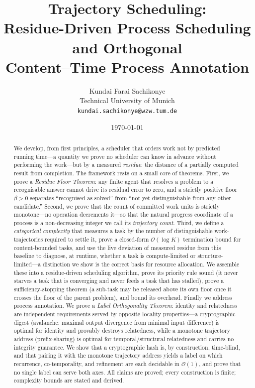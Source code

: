 \documentclass[twocolumn,10pt,a4paper]{article}
\title{\textbf{Trajectory Scheduling:\\[2pt]
Residue-Driven Process Scheduling and Orthogonal\\
Content--Time Process Annotation}}
\author{%
Kundai Farai Sachikonye\\
\small Technical University of Munich\\
\small \texttt{kundai.sachikonye@wzw.tum.de}}
\date{\today}
\theoremstyle{thmstyle}
\theoremstyle{definition}
\theoremstyle{remark}
\newcommand{\floor}{\beta}
\begin{document}
\maketitle

\begin{abstract}
\noindent
We develop, from first principles, a scheduler that orders work not by
predicted running time---a quantity we prove no scheduler can know in
advance without performing the work---but by a measured \emph{residue}:
the distance of a partially computed result from completion. The
framework rests on a small core of theorems. First, we prove a
\emph{Residue Floor Theorem}: any finite agent that resolves a problem
to a recognisable answer cannot drive its residual error to zero, and a
strictly positive floor $\floor>0$ separates ``recognised as solved''
from ``not yet distinguishable from any other candidate.'' Second, we
prove that the count of committed work units is strictly monotone---no
operation decrements it---so that the natural progress coordinate of a
process is a non-decreasing integer we call its \emph{trajectory count}.
Third, we define a \emph{categorical complexity} that measures a task by
the number of distinguishable work-trajectories required to settle it,
prove a closed-form $\mathcal{O}(\log K)$ termination bound for
content-bounded tasks, and use the live deviation of measured residue
from this baseline to diagnose, at runtime, whether a task is
compute-limited or structure-limited---a distinction we show is the
correct basis for resource allocation. We assemble these into a
residue-driven scheduling algorithm, prove its priority rule sound (it
never starves a task that is converging and never feeds a task that has
stalled), prove a sufficiency-stopping theorem (a sub-task may be
released above its own floor once it crosses the floor of the parent
problem), and bound its overhead. Finally we address process
annotation. We prove a \emph{Label Orthogonality Theorem}: identity and
relatedness are independent requirements served by opposite locality
properties---a cryptographic digest (avalanche: maximal output
divergence from minimal input difference) is optimal for identity and
provably destroys relatedness, while a monotone trajectory address
(prefix-sharing) is optimal for temporal/structural relatedness and
carries no integrity guarantee. We show that a cryptographic hash is, by
construction, time-blind, and that pairing it with the monotone
trajectory address yields a label on which recurrence, co-temporality,
and refinement are each decidable in $\mathcal{O}(1)$, and prove that no
single label can serve both axes. All claims are proved; every
construction is finite; complexity bounds are stated and derived.
\end{abstract}
\end{document}
